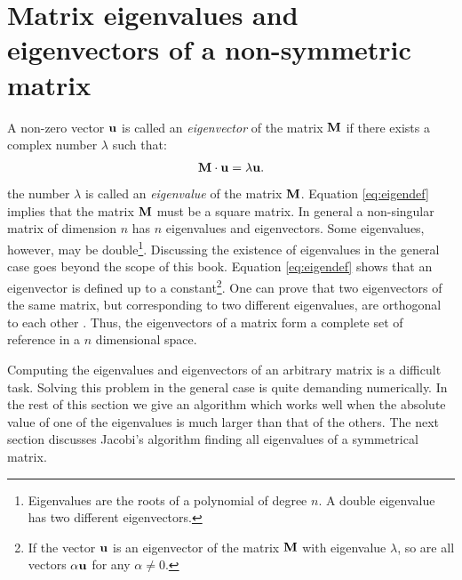 \documentclass[twoside]{book}
\begin{document}
\section{Matrix eigenvalues and eigenvectors of a non-symmetric matrix}
\label{sec:eigen} A non-zero vector ${\bf u}$ is called an {\sl
eigenvector} of the matrix ${\bf M}$ if there exists a complex
number $\lambda$ such that:
\begin{equation}
\label{eq:eigendef}
 {\bf M}\cdot{\bf u}=\lambda{\bf u}.
\end{equation}
the number $\lambda$ is called an {\sl eigenvalue} of the matrix
${\bf M}$. Equation \ref{eq:eigendef} implies that the matrix
${\bf M}$ must be a square matrix. In general a non-singular
matrix of dimension $n$ has $n$ eigenvalues and eigenvectors. Some
eigenvalues, however, may be double\footnote{Eigenvalues are the
roots of a polynomial of degree $n$. A double eigenvalue has two
different eigenvectors.}. Discussing the existence of eigenvalues
in the general case goes beyond the scope of this book. Equation
\ref{eq:eigendef} shows that an eigenvector is defined up to a
constant\footnote{If the vector ${\bf u}$ is an eigenvector of the
matrix ${\bf M}$ with eigenvalue $\lambda$, so are all vectors
$\alpha{\bf u}$ for any $\alpha\ne 0$.}. One can prove that two
eigenvectors of the same matrix, but corresponding to two
different eigenvalues, are orthogonal to each other \cite{Bass}.
Thus, the eigenvectors of a matrix form a complete set of
reference in a $n$ dimensional space.

Computing the eigenvalues and eigenvectors of an arbitrary matrix
is a difficult task. Solving this problem in the general case is
quite demanding numerically. In the rest of this section we give
an algorithm which works well when the absolute value of one of
the eigenvalues is much larger than that of the others. The next
section discusses Jacobi's algorithm finding all eigenvalues of a
symmetrical matrix.
\end{document}
